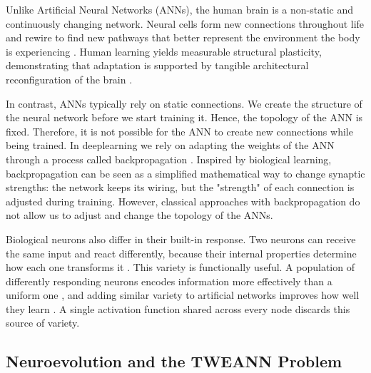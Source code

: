 \documentclass[12pt]{article}
\begin{document}
Unlike Artificial Neural Networks (ANNs), the human brain is a non-static and continuously changing network.
Neural cells form new connections throughout life and rewire to find new pathways that better represent the environment the body is experiencing \parencite{pascual-leone_plastic_2005,holtmaat_experience-dependent_2009}.
Human learning yields measurable structural plasticity, demonstrating that adaptation is supported by tangible architectural reconfiguration of the brain \parencite{draganski_changes_2004}.

In contrast, ANNs typically rely on static connections.
We create the structure of the neural network before we start training it.
Hence, the topology of the ANN is fixed.
Therefore, it is not possible for the ANN to create new connections while being trained.
In deeplearning we rely on adapting the weights of the ANN through a process called backpropagation \parencite{rumelhart_learning_1986}.
Inspired by biological learning, backpropagation can be seen as a simplified mathematical way to change synaptic strengths: the network keeps its wiring, but the "strength" of each connection is adjusted during training.
However, classical approaches with backpropagation do not allow us to adjust and change the topology of the ANNs.

Biological neurons also differ in their built-in response.
Two neurons can receive the same input and react differently, because their internal properties determine how each one transforms it \parencite{drion_ion_2015}.
This variety is functionally useful.
A population of differently responding neurons encodes information more effectively than a uniform one \parencite{tripathy_intermediate_2013}, and adding similar variety to artificial networks improves how well they learn \parencite{perez-nieves_neural_2021}.
A single activation function shared across every node discards this source of variety.



\subsection{Neuroevolution and the TWEANN Problem}
\label{subsec:neuroevolution}
\end{document}
